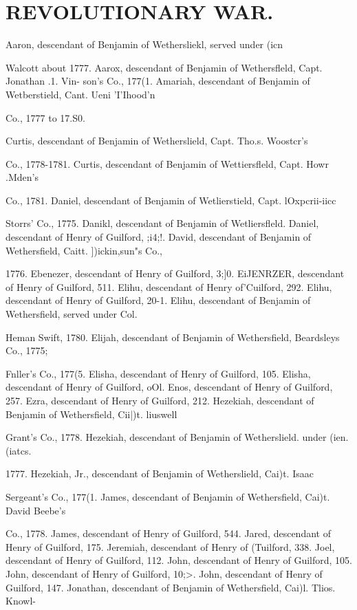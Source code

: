 \chapter{REVOLUTIONARY WAR.}
Aaron, descendant of Benjamin of Wethersliekl, served under (icn 

Walcott about 1777. 
Aarox, descendant of Benjamin of Wethersfleld, Capt. Jonathan .1. Vin- 
son's Co., 177(1. 
Amariah, descendant of Benjamin of Wetberstield, Cant. Ueni 'I'Ihood'n 

Co., 1777 to 17.S0.  

Curtis, descendant of Benjamin of Wetherslield, Capt. Tho.s. Woostcr's 

Co., 1778-1781. 
Curtis, descendant of Benjamin of Wettiersfleld, Capt. Howr .Mden's 

Co., 1781. 
Daniel, descendant of Benjamin of Wetlierstield, Capt. lOxpcrii-iicc 

Storrs' Co., 1775. 
Danikl, descendant of Benjamin of Wetliersfleld. 
Daniel, descendant of Henry of Guilford, ;i4;!. 
David, descendant of Benjamin of Wethersfield, Caitt. ])ickin,sun"s Co., 

1776. 
Ebenezer, descendant of Henry of Guilford, 3;]0. 
EiJENRZER, descendant of Henry of Guilford, 511. 
Elihu, descendant of Henry of'Cuilford, 292. 
Elihu, descendant of Henry of Guilford, 20-1. 
Elihu, descendant of Benjamin of Wethersfield, served under Col. 

Heman Swift, 1780. 
Elijah, descendant of Benjamin of Wethersfield, Beardsleys Co., 1775; 

Fnller's Co., 177(5. 
Elisha, descendant of Henry of Guilford, 105. 
Elisha, descendant of Henry of Guilford, oOl. 
Enos, descendant of Henry of Guilford, 257. 
Ezra, descendant of Henry of Guilford, 212. 
Hezekiah, descendant of Benjamin of Wethersfield, Cii|)t. liuswell 

Grant's Co., 1778. 
Hezekiah, descendant of Benjamin of Wetherslield. under (ien. (iatcs. 

1777. 
Hezekiah, Jr., descendant of Benjamin of Wetherslield, Cai)t. Isaac 

Sergeant's Co., 177(1. 
James, descendant of Benjamin of Wethersfield, Cai)t. David Beebe's 

Co., 1778. 
James, descendant of Henry of Guilford, 544. 
Jared, descendant of Henry of Guilford, 175. 
Jeremiah, descendant of Henry of (Tuilford, 338. 
Joel, descendant of Henry of Guilford, 112. 
John, descendant of Henry of Guilford, 105. 
John, descendant of Henry of Guilford, 10;>. 
John, descendant of Henry of Guilford, 147. 
Jonathan, descendant of Benjamin of Wethersfield, Cai)l. Tlios. Knowl- 


